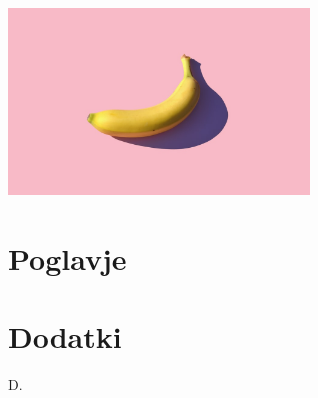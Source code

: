 \documentclass[a4paper, 12pt]{book}
\theoremstyle{definition}
\theoremstyle{remark}
\begin{document}
\includegraphics[width=0.6\textwidth]{pic.jpg}

\lipsum



\chapter{Poglavje}



\clearpage
{}





\clearpage
{}

\chapter*{Dodatki}
D.
\end{document}
